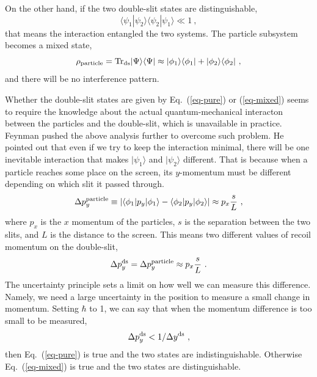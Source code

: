 \documentclass[aps,showpacs,onecolumn,floats,prd,superscriptaddress,nofootinbib]{revtex4-1}
\begin{document}
On the other hand, if the two double-slit states are distinguishable,
\begin{equation}
\langle\psi_1|\psi_2\rangle\langle\psi_2|\psi_1\rangle \ll 1~,
\label{eq-mixed}
\end{equation}
that means the interaction entangled the two systems. The particle subsystem becomes a mixed state,
\begin{equation}
\rho_{\rm particle} = {\rm Tr}_{\rm ds}|\Psi\rangle\langle\Psi| \approx
|\phi_1\rangle\langle\phi_1| + |\phi_2\rangle\langle\phi_2|~,
\end{equation}
and there will be no interference pattern.

Whether the double-slit states are given by Eq.~(\ref{eq-pure}) or (\ref{eq-mixed}) seems to require the knowledge about the actual quantum-mechanical interacton between the particles and the double-slit, which is unavailable in practice.
Feynman pushed the above analysis further to overcome such problem.
He pointed out that even if we try to keep the interaction minimal, there will be one inevitable interaction that makes $|\psi_1\rangle$ and $|\psi_2\rangle$ different.
That is because when a particle reaches some place on the screen, its $y$-momentum must be different depending on which slit it passed through.
\begin{equation}
\Delta p_y^{\rm particle} \equiv 
|\langle\phi_1|p_y|\phi_1\rangle - \langle\phi_2|p_y|\phi_2\rangle| 
\approx p_x \frac{s}{L}~,
\end{equation}
where $p_x$ is the $x$ momentum of the particles, $s$ is the separation between the two slits, and $L$ is the distance to the screen. 
This means two different values of recoil momentum on the double-slit,
\begin{equation}
\Delta p_y^{\rm ds} = \Delta p_y^{\rm particle} \approx p_x \frac{s}{L}~.
\label{eq-dpds}
\end{equation}
The uncertainty principle sets a limit on how well we can measure this difference. Namely, we need a large uncertainty in the position to measure a small change in momentum. Setting $\hbar$ to 1, we can say that when the momentum difference is too small to be measured,
\begin{equation}
\Delta p_y^{\rm ds} < 1/\Delta y^{\rm ds}~,
\label{eq-standard}
\end{equation} 
then Eq.~(\ref{eq-pure}) is true and the two states are indistinguishable. 
Otherwise Eq.~(\ref{eq-mixed}) is true and the two states are distinguishable.
\end{document}
